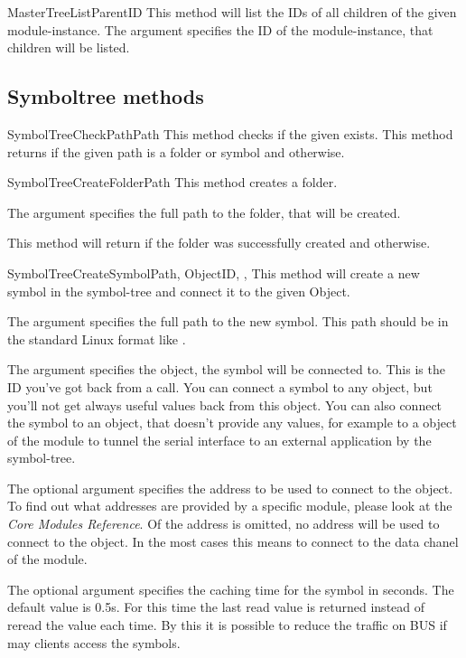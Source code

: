 \begin{methoddesc}[Core]{MasterTreeList}{ParentID}
This method will list the IDs of all children of the given module-instance. The argument  specifies the 
ID of the module-instance, that children will be listed. 
\end{methoddesc}


\subsection{Symboltree methods}
\begin{methoddesc}[Core]{SymbolTreeCheckPath}{Path}
This method checks if the given  exists. This method returns   if the given path is a folder or symbol
and  otherwise.
\end{methoddesc}


\begin{methoddesc}[Core]{SymbolTreeCreateFolder}{Path}
This method creates a folder. 

The argument  specifies the full path to the folder, that will be created. 

This method will return  if the folder was successfully created and 
 otherwise.
\end{methoddesc}


\begin{methoddesc}[Core]{SymbolTreeCreateSymbol}{Path, ObjectID, , }
This method will create a new symbol in the symbol-tree and connect it to the 
given Object.

The argument  specifies the full path to the new symbol. This path 
should be in the standard Linux format like .

The argument  specifies the object, the symbol will be connected
to. This is the ID you've got back from a  call. You can 
connect a symbol to any object, but you'll not get always useful values back 
from this object. You can also connect the symbol to an object, that doesn't provide
any values, for example to a object of the  module to tunnel the
serial interface to an external application by the symbol-tree.

The optional argument  specifies the address to be used to connect
to the object. To find out what addresses are provided by a specific module,
please look at the \textit{Core Modules Reference}. Of the address is omitted,
no address will be used to connect to the object. In the most cases this means
to connect to the data chanel of the module. 

The optional argument  specifies the caching time for the symbol in
seconds. The default value is 0.5s.
For this time the last read value is returned instead of reread the value each 
time. By this it is possible to reduce the traffic on BUS if may clients access 
the symbols.
\end{methoddesc}


